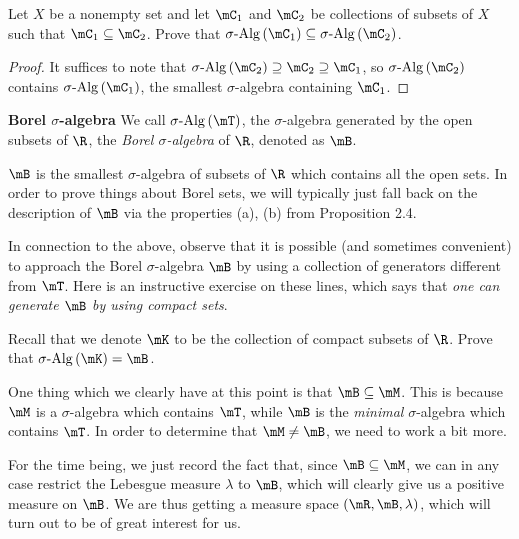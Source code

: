 \documentclass[pmath450]{subfiles}
\begin{document}
    \begin{exercise}{}
        Let $X$ be a nonempty set and let $\mC_1$ and $\mC_2$ be collections of subsets of $X$ such that $\mC_1\subseteq\mC_2$. Prove that $\sigalg\left( \mC_1 \right)\subseteq\sigalg\left( \mC_2 \right)$.
    \end{exercise}

    \begin{proof}
        It suffices to note that $\sigalg\left( \mC_2 \right)\supseteq\mC_2\supseteq\mC_1$, so $\sigalg\left( \mC_2 \right)$ contains $\sigalg\left( \mC_1 \right)$, the smallest $\sigma$-algebra containing $\mC_1$.
    \end{proof}

    \begin{definition}{\textbf{Borel $\sigma$-algebra}}
        We call $\sigalg\left( \mT \right)$, the $\sigma$-algebra generated by the open subsets of $\R$, the \emph{Borel $\sigma$-algebra} of $\R$, denoted as $\mB$.
    \end{definition}

    \np $\mB$ is the smallest $\sigma$-algebra of subsets of $\R$ which contains all the open sets. In order to prove things about Borel sets, we will typically just fall back on the description of $\mB$ via the properties (a), (b) from Proposition 2.4.

    In connection to the above, observe that it is possible (and sometimes convenient) to approach the Borel $\sigma$-algebra $\mB$ by using a collection of generators different from $\mT$. Here is an instructive exercise on these lines, which says that \textit{one can generate $\mB$ by using compact sets}.

    \begin{exercise}{}
        Recall that we denote $\mK$ to be the collection of compact subsets of $\R$. Prove that $\sigalg\left( \mK \right)=\mB$.
    \end{exercise}

    \placeqed[tl;dr]

    \np One thing which we clearly have at this point is that $\mB\subseteq\mM$. This is because $\mM$ is a $\sigma$-algebra which contains $\mT$, while $\mB$ is the \textit{minimal} $\sigma$-algebra which contains $\mT$. In order to determine that $\mM\neq\mB$, we need to work a bit more.

    For the time being, we just record the fact that, since $\mB\subseteq\mM$, we can in any case restrict the Lebesgue measure $\lambda$ to $\mB$, which will clearly give us a positive measure on $\mB$. We are thus getting a measure space $\left( \mR,\mB,\lambda \right)$, which will turn out to be of great interest for us.
\end{document}

